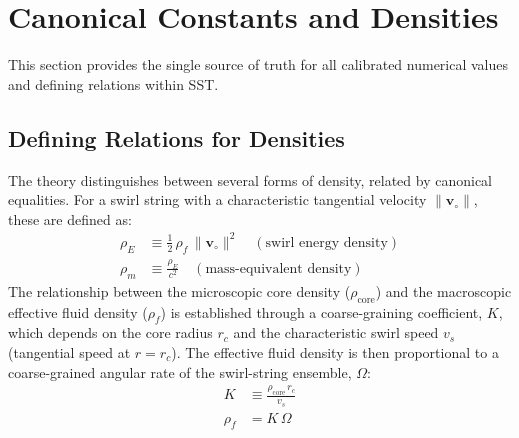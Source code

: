 \documentclass[11pt]{article}
\newcommand{\vswirl}{\mathbf{v}_{\circ}}
\newcommand{\vnorm}{\lVert \vswirl \rVert}
\newcommand{\rc}{r_c}
\newcommand{\rhof}{\rho_{\!f}}
\newcommand{\rhoE}{\rho_{\!E}}
\newcommand{\rhom}{\rho_{\!m}}
\newcommand{\rhocore}{\rho_{\mathrm{core}}}
\newcommand{\vscore}{v_{s}}
\begin{document}
\section{Canonical Constants and Densities}
This section provides the single source of truth for all calibrated numerical values and defining relations within SST.

\subsection{Defining Relations for Densities}
    The theory distinguishes between several forms of density, related by canonical equalities. For a swirl string with a characteristic tangential velocity $\vnorm$, these are defined as:
    \begin{align}
    \rhoE &\equiv \tfrac{1}{2}\,\rhof\,\vnorm^2 \quad (\text{swirl energy density}) \\
    \rhom &\equiv \frac{\rhoE}{c^2} \quad (\text{mass-equivalent density})
    \end{align}
    The relationship between the microscopic core density ($\rhocore$) and the macroscopic effective fluid density ($\rhof$) is established through a coarse-graining coefficient, $K$, which depends on the core radius $\rc$ and the characteristic swirl speed $\vscore$ (tangential speed at $r=\rc$). The effective fluid density is then proportional to a coarse-grained angular rate of the swirl-string ensemble, $\Omega$:
    \begin{align}
    K &\equiv \frac{\rhocore\,\rc}{\vscore} \\
    \rhof &= K\,\Omega
    \end{align}
\end{document}
